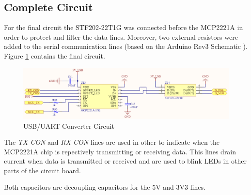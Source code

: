 	\subsection{Complete Circuit}\label{ssec:usb-uart-complete-circuit}

		For the final circuit the STF202-22T1G was connected before the MCP2221A in order to protect and filter the data lines. Moreover, two external resistors were added to the serial communication lines (based on the Arduino Rev3 Schematic \cite{arduino-rev3-schematic}). Figure \ref{fig:usb-uart-circuit} contains the final circuit.

		\begin{figure}[htbp]
			\centering
				\includegraphics[width=.8\textwidth]{figuras/fig-usb-uart-circuit}
			\caption{USB/UART Converter Circuit \cite{usb-uart-circuit}}
			\label{fig:usb-uart-circuit}
		\end{figure}

		The \textit{TX CON} and \textit{RX CON} lines are used in other to indicate when the MCP2221A chip is repectively transmitting or receiving data. This lines drain current when data is transmitted or received and are used to blink LEDs in other parts of the circuit board. 

		Both capacitors are decoupling capacitors for the 5V and 3V3 lines. 